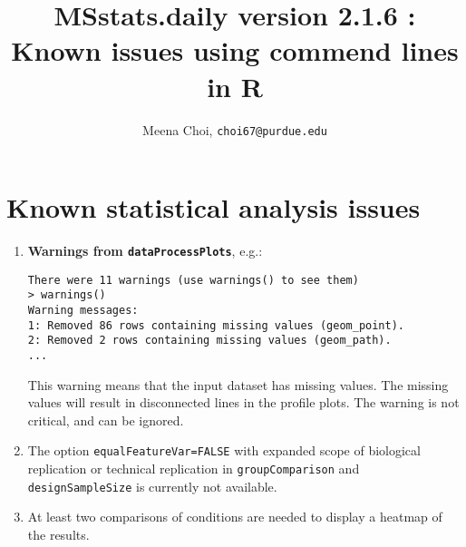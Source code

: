 \documentclass[10pt]{article}
\begin{document}
\noindent

\title{MSstats.daily version 2.1.6 : Known issues using commend lines in R}
\author{Meena Choi, {\tt choi67@purdue.edu}}
\maketitle





\section{Known statistical analysis issues}

\begin{enumerate}
\item {\bf Warnings from {\tt dataProcessPlots}}, e.g.:
\begin{small}
\begin{verbatim}
There were 11 warnings (use warnings() to see them)
> warnings()
Warning messages:
1: Removed 86 rows containing missing values (geom_point).
2: Removed 2 rows containing missing values (geom_path).
...
\end{verbatim}
\end{small}
This warning means that the input dataset has missing values. The missing values will result in disconnected lines in the profile plots. The warning is not critical, and can be ignored.


\item The option {\tt equalFeatureVar=FALSE} with expanded scope of biological replication or technical replication in {\tt groupComparison} and {\tt designSampleSize} is currently not available.

\item At least two comparisons of conditions are needed to display a heatmap of the results.


\end{enumerate}
\end{document}
